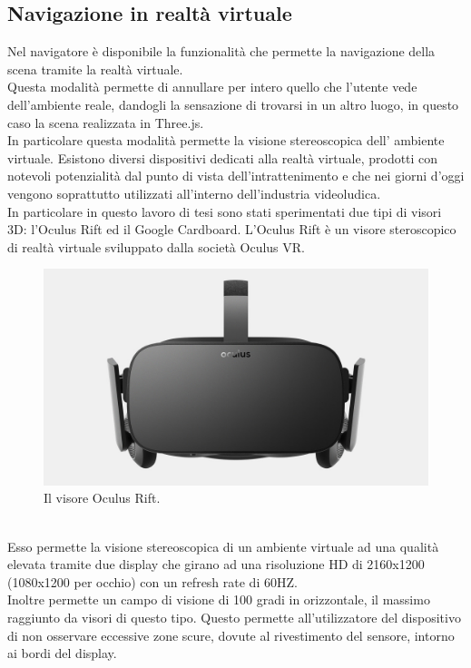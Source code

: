 \subsection{Navigazione in realtà virtuale}
Nel navigatore è disponibile la funzionalità che permette la navigazione della scena tramite la realtà virtuale.
\\
Questa modalità permette di annullare per intero quello che l’utente vede dell’ambiente reale, dandogli la sensazione di trovarsi in un altro luogo, in questo caso la scena realizzata in Three.js.
\\
In particolare questa modalità permette la visione stereoscopica dell’ ambiente virtuale.
Esistono diversi dispositivi dedicati alla realtà virtuale, prodotti con notevoli potenzialità dal punto di vista dell’intrattenimento e che nei giorni d’oggi vengono soprattutto utilizzati all’interno dell’industria videoludica.
\\
In particolare in questo lavoro di tesi sono stati sperimentati due tipi di visori 3D: l’Oculus Rift ed il Google Cardboard. 
L’Oculus Rift è un visore steroscopico di realtà virtuale sviluppato dalla società Oculus VR.
\begin{figure}[htb]
 \centering
 \includegraphics[width=0.8\linewidth]{images/chapter_navigazione_scena/oculus.jpg}\hfill
 \caption[Il visore Oculus Rift.]{Il visore Oculus Rift.}
 \label{fig:navigazione_scena_navigator_oculus}
\end{figure}
\\
Esso permette la visione stereoscopica di un ambiente virtuale ad una qualità elevata tramite due display che girano ad una risoluzione HD di 2160x1200 (1080x1200 per occhio) con un refresh rate di 60HZ.
\\
Inoltre permette un campo di visione di 100 gradi in orizzontale, il massimo raggiunto da visori di questo tipo. Questo permette all’utilizzatore del dispositivo di non osservare eccessive zone scure, dovute al rivestimento del sensore, intorno ai bordi del display. 
